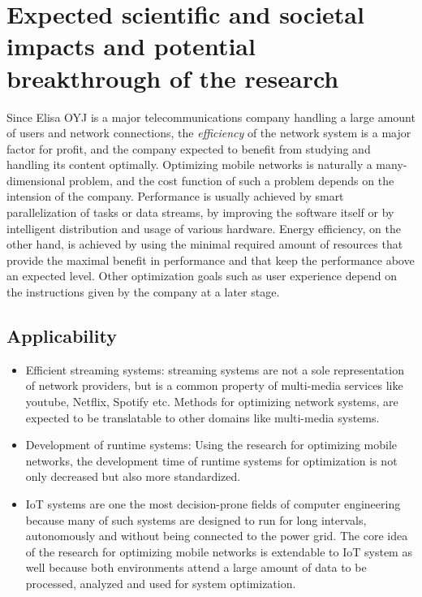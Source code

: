 \documentclass{article}
\begin{document}
\section{Expected scientific and societal impacts and potential breakthrough of the research}
Since Elisa OYJ is a major telecommunications company handling a large amount of users and network connections, the \textit{efficiency} of the network system is a major factor for profit, and the company expected to benefit from studying and handling its content optimally.
Optimizing mobile networks is naturally a many-dimensional problem, and the cost function of such a problem depends on the intension of the company.
Performance is usually achieved by smart parallelization of tasks or data streams, by improving the software itself or by intelligent distribution and usage of various hardware.
Energy efficiency, on the other hand, is achieved by using the minimal required amount of resources that provide the maximal benefit in performance and that keep the performance above an expected level.
Other optimization goals such as user experience depend on the instructions given by the company at a later stage.\vspace{0.2cm}

\subsection{Applicability}
\begin{itemize}
\item Efficient streaming systems: streaming systems are not a sole representation of network providers, but is a common property of multi-media services like youtube, Netflix, Spotify etc. Methods for optimizing network systems, are expected to be translatable to other domains like multi-media systems.
\vspace{-0.2cm}

\item Development of runtime systems: Using the research for optimizing mobile networks, the development time of runtime
systems for optimization is not only decreased but also more standardized. \vspace{-0.2cm}

\item IoT systems are one the most decision-prone fields of computer engineering because many of such systems are
designed to run for long intervals, autonomously and without being connected to the power grid. 
The core idea of the research for optimizing mobile networks is extendable to IoT system as well because both environments attend a large amount of data to be processed, analyzed and used for system optimization.

\end{itemize}
\end{document}
